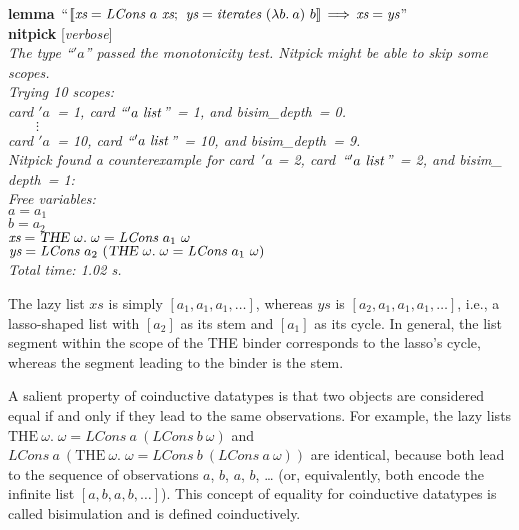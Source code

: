 \documentclass[a4paper,12pt]{article}
\begin{document}
\prew
\textbf{lemma}~``$\mathopen{[\![}\textit{xs} = \textit{LCons}~a~\textit{xs};\>\,
\textit{ys} = \textit{iterates}~(\lambda b.\> a)~b\mathclose{]\!]} \,\Longrightarrow\, \textit{xs} = \textit{ys}$'' \\
\textbf{nitpick} [\textit{verbose}] \\[2\smallskipamount]
\slshape The type ``\kern1pt$'a$'' passed the monotonicity test. Nitpick might be able to skip
some scopes. \\[2\smallskipamount]
Trying 10 scopes: \\
\hbox{}\qquad \textit{card} $'a$~= 1, \textit{card} ``\kern1pt$'a~\textit{list\/}$''~= 1,
and \textit{bisim\_depth}~= 0. \\
\hbox{}\qquad $\qquad\vdots$ \\[.5\smallskipamount]
\hbox{}\qquad \textit{card} $'a$~= 10, \textit{card} ``\kern1pt$'a~\textit{list\/}$''~= 10,
and \textit{bisim\_depth}~= 9. \\[2\smallskipamount]
Nitpick found a counterexample for {\itshape card}~$'a$ = 2,
\textit{card}~``\kern1pt$'a~\textit{list\/}$''~= 2, and \textit{bisim\_\allowbreak
depth}~= 1:
\\[2\smallskipamount]
\hbox{}\qquad Free variables: \nopagebreak \\
\hbox{}\qquad\qquad $\textit{a} = a_1$ \\
\hbox{}\qquad\qquad $\textit{b} = a_2$ \\
\hbox{}\qquad\qquad $\textit{xs} = \textsl{THE}~\omega.\; \omega = \textit{LCons}~a_1~\omega$ \\
\hbox{}\qquad\qquad $\textit{ys} = \textit{LCons}~a_2~(\textsl{THE}~\omega.\; \omega = \textit{LCons}~a_1~\omega)$ \\[2\smallskipamount]
Total time: 1.02 s.
\postw

The lazy list $\textit{xs}$ is simply $[a_1, a_1, a_1, \ldots]$, whereas
$\textit{ys}$ is $[a_2, a_1, a_1, a_1, \ldots]$, i.e., a lasso-shaped list with
$[a_2]$ as its stem and $[a_1]$ as its cycle. In general, the list segment
within the scope of the {THE} binder corresponds to the lasso's cycle, whereas
the segment leading to the binder is the stem.

A salient property of coinductive datatypes is that two objects are considered
equal if and only if they lead to the same observations. For example, the lazy
lists $\textrm{THE}~\omega.\; \omega =
\textit{LCons}~a~(\textit{LCons}~b~\omega)$ and
$\textit{LCons}~a~(\textrm{THE}~\omega.\; \omega =
\textit{LCons}~b~(\textit{LCons}~a~\omega))$ are identical, because both lead
to the sequence of observations $a$, $b$, $a$, $b$, \hbox{\ldots} (or,
equivalently, both encode the infinite list $[a, b, a, b, \ldots]$). This
concept of equality for coinductive datatypes is called bisimulation and is
defined coinductively.
\end{document}

